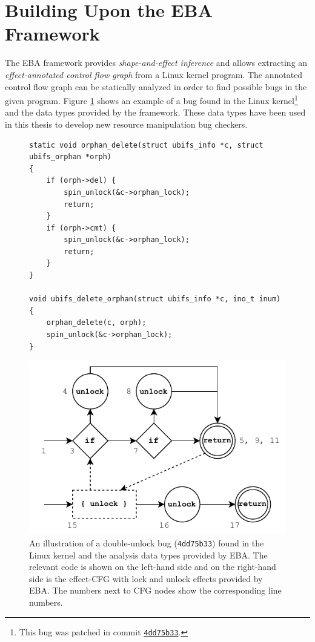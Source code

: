 \section{Building Upon the EBA Framework}
The EBA framework provides \textit{shape-and-effect inference} and allows extracting an \textit{effect-annotated control flow graph} from a Linux kernel program. The annotated control flow graph can be statically analyzed in order to find possible bugs in the given program. Figure \ref{initial-bug-visualisation} shows an example of a bug found in the Linux kernel\footnote{This bug was patched in commit \href{https://github.com/torvalds/linux/commit/4dd75b33}{\texttt{4dd75b33}}.} and the data types provided by the framework. These data types have been used in this thesis to develop new resource manipulation bug checkers.

\begin{figure}[H]
\centering
\begin{minipage}{0.4\textwidth}
    \begin{verbatim}
static void orphan_delete(struct ubifs_info *c, struct ubifs_orphan *orph)
{
	if (orph->del) {
		spin_unlock(&c->orphan_lock);
		return;
	}
	if (orph->cmt) {
		spin_unlock(&c->orphan_lock);
		return;
	}
}

void ubifs_delete_orphan(struct ubifs_info *c, ino_t inum)
{
	orphan_delete(c, orph);
	spin_unlock(&c->orphan_lock);
}
\end{verbatim}
\end{minipage}
\hspace*{0.05\textwidth}
\begin{minipage}{0.45\textwidth}
    \includegraphics[width=\textwidth]{background/figures/annotated-cfg}
\end{minipage}
\caption{An illustration of a double-unlock bug (\texttt{4dd75b33}) found in the Linux kernel and the analysis data types provided by EBA. The relevant code is shown on the left-hand side and on the right-hand side is the effect-CFG with lock and unlock effects provided by EBA. The numbers next to CFG nodes show the corresponding line numbers.}
\label{initial-bug-visualisation}
\end{figure}

